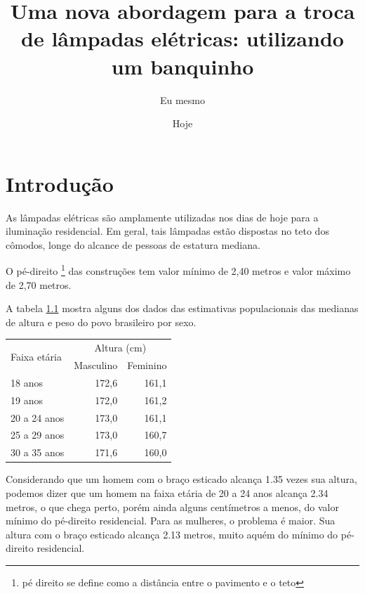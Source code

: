 \documentclass{report}
\author{Eu mesmo}
\date{Hoje}
\title{Uma nova abordagem para a troca de
       lâmpadas elétricas: utilizando um banquinho}
\begin{document}
\maketitle

\chapter{Introdução}
\label{sec:intro}

As lâmpadas elétricas são amplamente utilizadas nos dias
de hoje para a iluminação residencial.
Em geral, tais lâmpadas estão dispostas no teto dos cômodos,
longe do alcance de pessoas de estatura mediana.

O pé-direito 
\footnote{pé direito se define como a distância entre o pavimento e o teto}
das construções tem valor mínimo de 2,40 metros e valor máximo de 2,70 metros.

A tabela \ref{tab:ibge} mostra alguns dos dados das estimativas populacionais das
medianas de altura e peso do povo brasileiro por sexo.

\begin{table}[!htb]
  	\centering
  	\begin{tabular}{|l|r|r|}
  	\hline
    \multirow{2}{*}{Faixa etária} & \multicolumn{2}{|c|}{Altura (cm)} \\ \cline{2-3}
                 & Masculino & Feminino \\ \hline
    18      anos & 172,6 & 161,1 \\
    19      anos & 172,0 & 161,2 \\
    20 a 24 anos & 173,0 & 161,1 \\
    25 a 29 anos & 173,0 & 160,7 \\
    30 a 35 anos & 171,6 & 160,0 \\
    \hline
    \end{tabular}
    \label{tab:ibge}
\end{table}

Considerando que um homem com o braço esticado alcança 1.35 vezes sua altura,
podemos dizer que um homem na faixa etária de 20 a 24 anos alcança 2.34 metros,
o que chega perto, porém ainda alguns centímetros a menos, do valor mínimo do
pé-direito residencial.
Para as mulheres, o problema é maior. Sua altura com o braço esticado alcança
2.13 metros, muito aquém do mínimo do pé-direito residencial.
\end{document}
